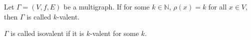 Let $\Gamma = (V, f, E)$ be a multigraph. If for some $k \in \mathbb{N}$, $\rho(x) = k$ for all $x \in V$, then $\Gamma$ is called $k$-valent.

$\Gamma$ is called isovalent if it is $k$-valent for some $k$.
